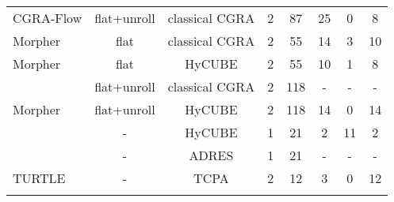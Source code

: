 \begin{table}
{\begin{tabular}{|l|c|c|c|c|c|c|c|}
 {CGRA-Flow}                                          & flat+unroll                          & classical CGRA                            & 2                              & 87                            & 25                         & 0                                   & 8 \\ 
 {Morpher}                                            & {flat}                               & classical CGRA                            & 2                              & 55                            & 14                         & 3                                   & 10 \\
 {Morpher}                                            & {flat}                               & HyCUBE                               & 2                              & 55                            & 10                         & 1                                   & 8 \\
 \rowcolor{darkRed!50}{Morpher}                       & {flat+unroll}                        & classical CGRA                            & 2                              & 118                           & -                          & -                                   & - \\ 
 {Morpher}                                            & {flat+unroll}                        & HyCUBE                               & 2                              & 118                           & 14                         & 0                                   & 14 \\
 \rowcolor{darkOrange!50}{CGRA-ME}                    & {-}                                  & HyCUBE                               & 1                              & 21                            & 2                          & 11                                  & 2 \\
 \rowcolor{darkRed!50}{Pillars}                       & {-}                                  & ADRES                                & 1                              & 21                            & -                          & -                                   & - \\
 {TURTLE}                                               & {-}                                  & TCPA                               & 2                              & 12                            & 3                          & 0                                   & 12 \\ \hline\hline
 \rowcolor{darkGray} \multicolumn{8}{|c|}{\color{white}{\textbf{GESUMMV}}} \\\hline

\end{tabular}}
\end{table}
